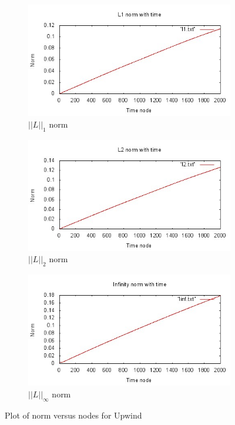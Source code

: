 \documentclass[a4paper,12pt]{report}
\begin{document}
\begin{figure}[h!]  
	\centering
	\begin{subfigure}[b]{0.7\textwidth}
		\includegraphics[width=\textwidth]{upwl1.jpeg}
                \caption{$||L||_1$ norm}
                \label{fig:upwl1}
	\end{subfigure}
	\begin{subfigure}[b]{0.7\textwidth}
		\includegraphics[width=\textwidth]{upwl2.jpeg}
                \caption{$||L||_2$ norm}
                \label{fig:upwl2}
	\end{subfigure}
	\begin{subfigure}[b]{0.7\textwidth}
		\includegraphics[width=\textwidth]{upwlinf.jpeg}
                \caption{$||L||_{\infty}$ norm}
                \label{fig:upwlinf}
	\end{subfigure}
	\caption{Plot of norm versus nodes for Upwind}
	\label{Normsupw}
\end{figure}
\end{document}
